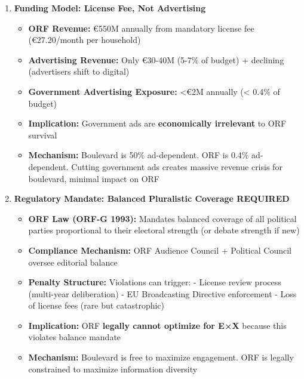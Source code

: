 \begin{enumerate}

\item \textbf{Funding Model: License Fee, Not Advertising}
  \begin{itemize}
  \item \textbf{ORF Revenue:} €550M annually from mandatory license fee (€27.20/month per household)
  \item \textbf{Advertising Revenue:} Only €30-40M (5-7\% of budget) + declining (advertisers shift to digital)
  \item \textbf{Government Advertising Exposure:} <€2M annually (< 0.4\% of budget)
  \item \textbf{Implication:} Government ads are \textbf{economically irrelevant} to ORF survival
  \item \textbf{Mechanism:} Boulevard is 50\% ad-dependent. ORF is 0.4\% ad-dependent. Cutting government ads
    creates massive revenue crisis for boulevard, minimal impact on ORF
  \end{itemize}

\item \textbf{Regulatory Mandate: Balanced Pluralistic Coverage REQUIRED}
  \begin{itemize}
  \item \textbf{ORF Law (ORF-G 1993):} Mandates balanced coverage of all political parties proportional to
    their electoral strength (or debate strength if new)
  \item \textbf{Compliance Mechanism:} ORF Audience Council + Political Council oversee editorial balance
  \item \textbf{Penalty Structure:} Violations can trigger:
    - License review process (multi-year deliberation)
    - EU Broadcasting Directive enforcement
    - Loss of license fees (rare but catastrophic)
  \item \textbf{Implication:} ORF \textbf{legally cannot optimize for E×X} because this violates balance mandate
  \item \textbf{Mechanism:} Boulevard is free to maximize engagement. ORF is legally constrained to maximize
    information diversity
  \end{itemize}


\end{enumerate}
